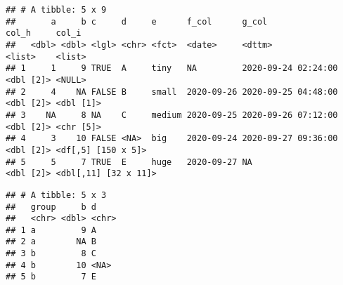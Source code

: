 \documentclass[
]{book}
\newenvironment{Shaded}{\begin{snugshade}}{\end{snugshade}}
\newcommand{\DecValTok}[1]{\textcolor[rgb]{0.00,0.00,0.81}{#1}}
\newcommand{\KeywordTok}[1]{\textcolor[rgb]{0.13,0.29,0.53}{\textbf{#1}}}
\newcommand{\NormalTok}[1]{#1}
\newcommand{\OperatorTok}[1]{\textcolor[rgb]{0.81,0.36,0.00}{\textbf{#1}}}
\newcommand{\StringTok}[1]{\textcolor[rgb]{0.31,0.60,0.02}{#1}}
\begin{document}
\begin{Shaded}
\end{Shaded}

\begin{verbatim}
## # A tibble: 5 x 9
##       a     b c     d     e      f_col      g_col               col_h     col_i               
##   <dbl> <dbl> <lgl> <chr> <fct>  <date>     <dttm>              <list>    <list>              
## 1     1     9 TRUE  A     tiny   NA         2020-09-24 02:24:00 <dbl [2]> <NULL>              
## 2     4    NA FALSE B     small  2020-09-26 2020-09-25 04:48:00 <dbl [2]> <dbl [1]>           
## 3    NA     8 NA    C     medium 2020-09-25 2020-09-26 07:12:00 <dbl [2]> <chr [5]>           
## 4     3    10 FALSE <NA>  big    2020-09-24 2020-09-27 09:36:00 <dbl [2]> <df[,5] [150 x 5]>  
## 5     5     7 TRUE  E     huge   2020-09-27 NA                  <dbl [2]> <dbl[,11] [32 x 11]>
\end{verbatim}

\begin{Shaded}
\end{Shaded}

\begin{verbatim}
## # A tibble: 5 x 3
##   group     b d    
##   <chr> <dbl> <chr>
## 1 a         9 A    
## 2 a        NA B    
## 3 b         8 C    
## 4 b        10 <NA> 
## 5 b         7 E
\end{verbatim}

\begin{Shaded}
\end{Shaded}
\end{document}
